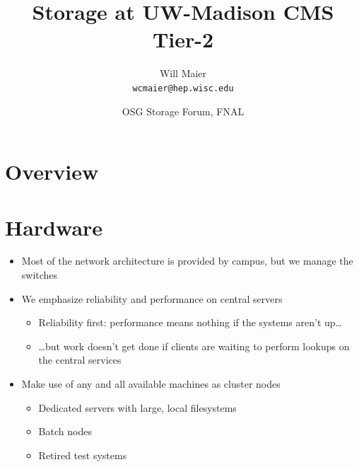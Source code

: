 \documentclass{beamer}
\title{Storage at UW-Madison CMS Tier-2}
\author[Maier]{
    Will Maier \\ 
    {\tt wcmaier@hep.wisc.edu}}
\institute[Wisconsin]{University of Wisconsin - High Energy Physics}
\date[2009.06.30]{OSG Storage Forum, FNAL}
\begin{document}

\begin{frame}
    \titlepage
\end{frame}

\section{Overview}
\begin{frame}
    \tableofcontents
\end{frame}

\section{Hardware}
\begin{frame}
\begin{itemize}
	\item Most of the network architecture is provided by campus, but we manage the switches
	\item We emphasize reliability and performance on central servers
	\begin{itemize}
		\item Reliability first: performance means nothing if the systems aren't up\ldots{}
		\item \ldots{}but work doesn't get done if clients are waiting to perform lookups on the central services
	\end{itemize}
	\item Make use of any and all available machines as cluster nodes
	\begin{itemize}
		\item Dedicated servers with large, local filesystems
		\item Batch nodes
		\item Retired test systems
	\end{itemize}
\end{itemize}
\end{frame}
\end{document}
